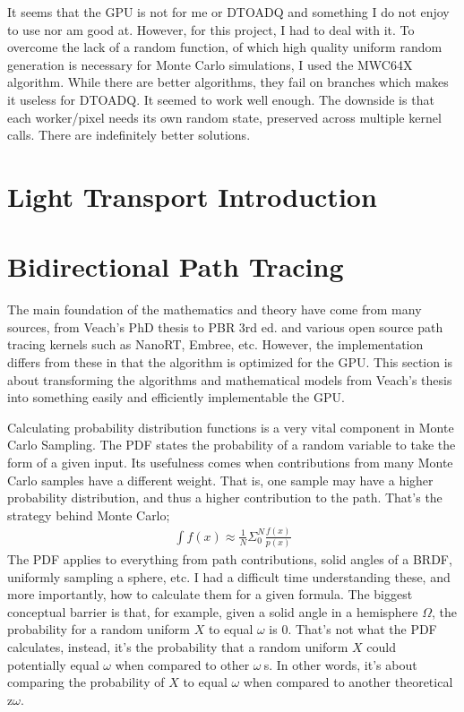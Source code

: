 \documentclass{article}
\begin{document}
  	It seems that the GPU is not for me or DTOADQ and something I do not enjoy to use nor am good at. However, for this project, I had to deal with it. To overcome the lack of a random function, of which high quality uniform random generation is necessary for Monte Carlo simulations, I used the MWC64X algorithm. While there are better algorithms, they fail on branches which makes it useless for DTOADQ. It seemed to work well enough. The downside is that each worker/pixel needs its own random state, preserved across multiple kernel calls. There are indefinitely better solutions.
  \section{Light Transport Introduction}
  \section{Bidirectional Path Tracing}
    The main foundation of the mathematics and theory have come from many sources, from Veach's PhD thesis to PBR 3rd ed. and various open source path tracing kernels such as NanoRT, Embree, etc. However, the implementation differs from these in that the algorithm is optimized for the GPU. This section is about transforming the algorithms and mathematical models from Veach's thesis into something easily and efficiently implementable the GPU.

    Calculating probability distribution functions is a very vital component in
    Monte Carlo Sampling. The PDF states the probability of a random variable to
    take the form of a given input. Its usefulness comes when contributions from
    many Monte Carlo samples have a different weight. That is, one sample may
    have a higher probability distribution, and thus a higher contribution to
    the path. That's the strategy behind Monte Carlo;
    \begin{align}
      \int f(x) \approx \frac{1}{N}\Sigma_0^N\frac{f(x)}{p(x)}
    \end{align}
    The PDF applies to everything from path contributions, solid angles of a
    BRDF, uniformly sampling a sphere, etc. I had a difficult time understanding
    these, and more importantly, how to calculate them for a given formula. The
    biggest conceptual barrier is that, for example, given a solid angle in a
    hemisphere $\Omega$, the probability for a random uniform $X$ to equal
    $\omega$ is 0. That's not what the PDF calculates, instead, it's the
    probability that a random uniform $X$ could potentially equal $\omega$ when compared to other $\omega\:$s. In other words, it's about comparing the probability of $X$ to equal $\omega$ when compared to another theoretical z$\omega$.
\end{document}

